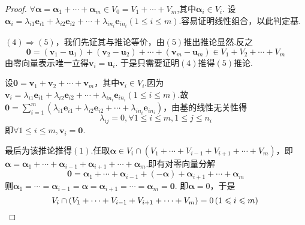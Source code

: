 {\begin{proof}
        $\forall \bm{\alpha}=\bm{\alpha}_1+\cdots+\bm{\alpha}_m\in V_0=
            V_1+\cdots+V_m$,其中$\bm{\alpha}_i\in V_i.$
        设$\bm{\alpha}_i=
            \lambda_{i1}\bm{e}_{i1}+\lambda_{i2}\bm{e}_{i2}+\cdots+\lambda_{in_i}
            \bm{e}_{in_i}\left(1\leqslant i \leqslant m\right)$.容易证明线性组合，以此判定基.

        $(4)\Longrightarrow (5)$，我们先证其与推论等价，由$(5)$推出推论显然.反之
        \[
            \bm{0}=\left(\bm{v}_1-\bm{u}_1\right)+\left(
            \bm{v}_2-\bm{u}_2
            \right)+\cdots+\left(\bm{v}_m-\bm{u}_m\right)\in V_1+V_2+\cdots+V_m
        \]
        由零向量表示唯一立得$\bm{v}_i=\bm{u}_i.$
        于是只需要证明$(4)$推得$(5)$推论.

        设$\bm{0}=\bm{v}_1+\bm{v}_2+\cdots+\bm{v}_m$，其中$\bm{v}_i\in V_i.$因为
        $\bm{v}_i=
            \lambda_{i1}\bm{e}_{i1}+\lambda_{i2}\bm{e}_{i2}+\cdots+\lambda_{in_i}
            \bm{e}_{in_i}\left(
            1\leqslant i\leqslant m
            \right)$.故
        $\displaystyle
            \bm{0}=\sum_{i=1}^{m}\left(
            \lambda_{i1}\bm{e}_{i1}+\lambda_{i2}\bm{e}_{i2}+\cdots+\lambda_{in_i}
            \bm{e}_{in_i}
            \right)$，由基的线性无关性得
        \[
            \lambda_{ij}=0,\forall 1\leqslant i\leqslant m,1\leqslant j\leqslant n_i
        \]
        即$\forall 1\leqslant i\leqslant m,\bm{v}_i=\bm{0}$.

        最后为该推论推得$(1)$.任取$
            \bm{\alpha}\in V_i\cap \left(V_1+\cdots+V_{i-1}+V_{i+1}+\cdots+
            V_m\right)$，即$\bm{\alpha}=\bm{\alpha}_1+\cdots+\bm{\alpha}_{i-1}+\bm{\alpha}_{i+1}+\cdots+\bm{\alpha}_m$.即有对零向量分解
        \[
            \bm{0}=\bm{\alpha}_1+\cdots
            +\bm{\alpha}_{i-1}+\left(-\bm{\alpha}
            \right)+\bm{\alpha}_{i+1}+\cdots+\bm{\alpha}_m
        \]
        则$\bm{\alpha}_1=\cdots=\bm{\alpha}_{i-1}=\bm{\alpha}=
            \bm{\alpha}_{i+1}=\cdots=\bm{\alpha}_m=\bm{0}.$
        即$\bm{\alpha}=0$，于是
        \[
            V_i\cap \left(V_1+\cdots+V_{i-1}+V_{i+1}+\cdots+
            V_m\right)=0\left(1\leqslant i\leqslant
            m\right)
            \qedhere
        \]
    \end{proof}
}